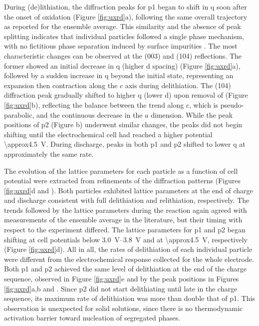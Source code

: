 \documentclass{article}
\begin{document}
During (de)lithiation, the diffraction peaks for \gls{p1} began to
shift in \gls{q} soon after the onset of oxidation (Figure
\ref{fig:uxrd}a), following the same overall trajectory as reported
for the ensemble average\cite{robert2015}. This similarity and the
absence of peak splitting indicates that individual particles followed
a single phase mechanism, with no fictitious phase separation induced
by surface impurities \cite{grenier2017}. The most characteristic
changes can be observed at the (003) and (104) reflections. The former
showed an initial decrease in \gls{q} (higher d spacing) (Figure
\ref{fig:uxrd}a), followed by a sudden increase in \gls{q} beyond the
initial state, representing an expansion then contraction along the
$c$ axis during delithiation\cite{robert2015}. The (104) diffraction
peak gradually shifted to higher \gls{q} (lower d) upon removal
of  (Figure \ref{fig:uxrd}b), reflecting the balance between
the trend along $c$, which is pseudo-parabolic, and the continuous
decrease in the $a$ dimension.\cite{robert2015} While the peak
positions of \gls{p2} (Figure b) underwent
similar changes, the peaks did not begin shifting until the
electrochemical cell had reached a higher potential
\SI{\approx4.5}{\volt}. During discharge, peaks in both \gls{p1} and
\gls{p2} shifted to lower \gls{q} at approximately the same rate.

The evolution of the lattice parameters for each particle as a
function of cell potential were extracted from refinements of the
diffraction patterns (Figures \ref{fig:uxrd}d and
). Both particles exhibited lattice parameters
at the end of charge and discharge consistent with full delithiation
and relithiation, respectively\cite{novak2015}. The trends followed by
the lattice parameters during the reaction again agreed with
measurements of the ensemble average in the literature\cite{novak2015,
  faenza2018}, but their timing with respect to the experiment
differed. The lattice parameters for \gls{p1} and \gls{p2} began
shifting at cell potentials below \SIrange{3.0}{3.8}{\volt} and at
\SI{\approx4.5}{\volt}, respectively (Figure \ref{fig:uxrd}d). All in
all, the rates of delithiation of each individual particle were
different from the electrochemical response collected for the whole
electrode. Both \gls{p1} and \gls{p2} achieved the same level of
delithiation at the end of the charge sequence, observed in Figure
\ref{fig:uxrd}e and by the peak positions in Figures \ref{fig:uxrd}a,b
and . Since \gls{p2} did not start delithiating
until late in the charge sequence, its maximum rate of delithiation
was more than double that of \gls{p1}. This observation is unexpected
for solid solutions, since there is no thermodynamic activation
barrier toward nucleation of segregated phases.
\end{document}
